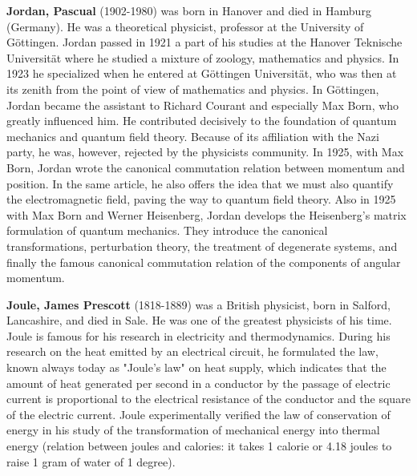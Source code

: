 \textbf{Jordan, Pascual} (1902-1980) was born in Hanover and died in Hamburg (Germany). He was a theoretical physicist, professor at the University of Göttingen. Jordan passed in 1921 a part of his studies at the Hanover Teknische Universität where he studied a mixture of zoology, mathematics and physics. In 1923 he specialized when he entered at Göttingen Universität, who was then at its zenith from the point of view of mathematics and physics. In Göttingen, Jordan became the assistant to Richard Courant and especially Max Born, who greatly influenced him. He contributed decisively to the foundation of quantum mechanics and quantum field theory. Because of its affiliation with the Nazi party, he was, however, rejected by the physicists community. In 1925, with Max Born, Jordan wrote the canonical commutation relation between momentum and position. In the same article, he also offers the idea that we must also quantify the electromagnetic field, paving the way to quantum field theory. Also in 1925 with Max Born and Werner Heisenberg, Jordan develops the Heisenberg's matrix formulation of quantum mechanics. They introduce the canonical transformations, perturbation theory, the treatment of degenerate systems, and finally the famous canonical commutation relation of the components of angular momentum.

\textbf{Joule, James Prescott} (1818-1889) was a  British physicist, born in Salford, Lancashire, and died in Sale. He was one of the greatest physicists of his time. Joule is famous for his research in electricity and thermodynamics. During his research on the heat emitted by an electrical circuit, he formulated the law, known always today as "Joule's law" on heat supply, which indicates that the amount of heat generated per second in a conductor by the passage of electric current is proportional to the electrical resistance of the conductor and the square of the electric current. Joule experimentally verified the law of conservation of energy in his study of the transformation of mechanical energy into thermal energy (relation between joules and calories: it takes 1 calorie or 4.18 joules to raise 1 gram of water of 1 degree).

